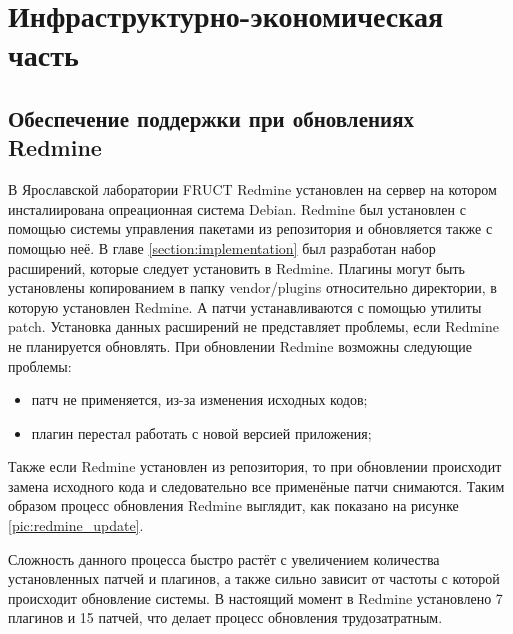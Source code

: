 \chapter{Инфраструктурно-экономическая часть}
\section{Обеспечение поддержки при обновлениях Redmine}
В Ярославской лаборатории FRUCT Redmine установлен на сервер на котором
инсталиирована опреационная система Debian. Redmine был установлен с помощью
системы управления пакетами из репозитория и обновляется также с помощью неё.
В главе \ref{section:implementation} был разработан набор расширений, которые
следует установить в Redmine. Плагины могут быть установлены 
копированием в папку vendor/plugins относительно директории, в которую
установлен Redmine. А патчи устанавливаются с помощью утилиты patch. Установка
данных расширений не представляет проблемы, если Redmine не планируется
обновлять. При обновлении Redmine возможны следующие проблемы:
\begin{itemize}
  \item патч не применяется, из-за изменения исходных кодов;
  \item плагин перестал работать с новой версией приложения;
\end{itemize}
Также если Redmine установлен из репозитория, то при обновлении происходит
замена исходного кода и следовательно все применёные патчи снимаются. Таким
образом процесс обновления Redmine выглядит, как показано на рисунке
\ref{pic:redmine_update}.


Сложность данного процесса быстро растёт с увеличением количества установленных
патчей и плагинов, а также сильно зависит от частоты с которой происходит
обновление системы. В настоящий момент в Redmine установлено 7 плагинов и 15
патчей, что делает процесс обновления трудозатратным.


